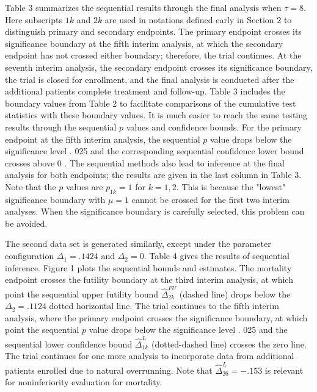 \documentclass[10pt]{article}
\begin{document}
Table 3 summarizes the sequential results through the final analysis when $\tau=8$. Here subscripts $1 k$ and $2 k$ are used in notations defined early in Section 2 to distinguish primary and secondary endpoints. The primary endpoint crosses its significance boundary at the fifth interim analysis, at which the secondary endpoint has not crossed either boundary; therefore, the trial continues. At the seventh interim analysis, the secondary endpoint crosses its significance boundary, the trial is closed for enrollment, and the final analysis is conducted after the additional patients complete treatment and follow-up. Table 3 includes the boundary values from Table 2 to facilitate comparisons of the cumulative test statistics with these boundary values. It is much easier to reach the same testing results through the sequential $p$ values and confidence bounds. For the primary endpoint at the fifth interim analysis, the sequential $p$ value drops below the significance level . 025 and the corresponding sequential confidence lower bound crosses above 0 . The sequential methods also lead to inference at the final analysis for both endpoints; the results are given in the last column in Table 3. Note that the $p$ values are $p_{1 k}=1$ for $k=1,2$. This is because the "lowest" significance boundary with $\mu=1$ cannot be crossed for the first two interim analyses. When the significance boundary is carefully selected, this problem can be avoided.

The second data set is generated similarly, except under the parameter configuration $\Delta_{1}=.1424$ and $\Delta_{2}=0$. Table 4 gives the results of sequential inference. Figure 1 plots the sequential bounds and estimates. The mortality endpoint crosses the futility boundary at the third interim analysis, at which point the sequential upper futility bound $\hat{\Delta}_{2 k}^{F U}$ (dashed line) drops below the $\Delta_{2}=.1124$ dotted horizontal line. The trial continues to the fifth interim analysis, where the primary endpoint crosses the significance boundary, at which point the sequential $p$ value drops below the significance level . 025 and the sequential lower confidence bound $\hat{\Delta}_{1 k}^{L}$ (dotted-dashed line) crosses the zero line. The trial continues for one more analysis to incorporate data from additional patients enrolled due to natural overrunning. Note that $\hat{\Delta}_{26}^{L}=-.153$ is relevant for noninferiority evaluation for mortality.
\end{document}
